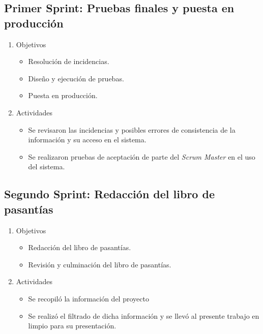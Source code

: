     \subsection{Primer Sprint: Pruebas finales y puesta en producción}
    \begin{enumerate}
        \item Objetivos
        \begin{itemize}
            \item Resolución de incidencias.
            \item Diseño y ejecución de pruebas.
            \item Puesta en producción.
        \end{itemize}
        \item Actividades
        \begin{itemize}
            \item Se revisaron las incidencias y posibles errores de consistencia de la información y su acceso en el sistema.
            \item Se realizaron pruebas de aceptación de parte del \textit{Scrum Master} en el uso del sistema.
        \end{itemize}
    \end{enumerate}
        
    \subsection{Segundo Sprint: Redacción del libro de pasantías}
    \begin{enumerate}
        \item Objetivos
        \begin{itemize}
            \item Redacción del libro de pasantías.
            \item Revisión y culminación del libro de pasantías.
        \end{itemize}
        \item Actividades
        \begin{itemize}
            \item Se recopiló la información del proyecto
            \item Se realizó el filtrado de dicha información y se llevó al presente trabajo en limpio para su presentación.
        \end{itemize}
    \end{enumerate}
        
        
